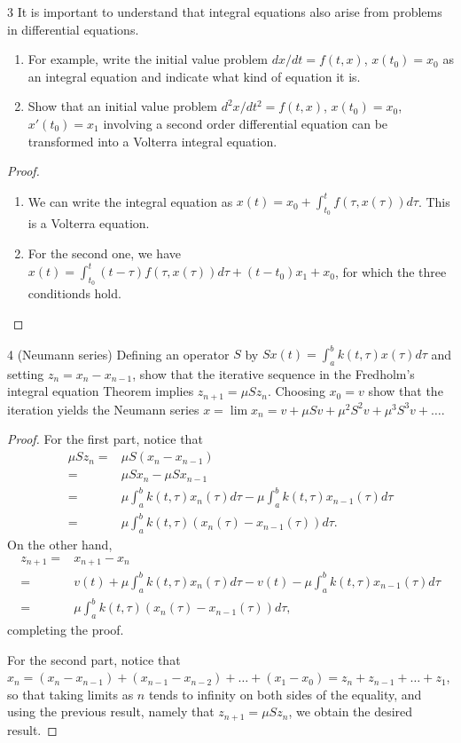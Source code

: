 \begin{exercise}{3}
It is important to understand that integral equations also arise from problems in differential equations.
\begin{enumerate}
    \item For example, write the initial value problem $dx/dt = f(t, x)$, $x(t_0) = x_0$ as an integral equation and indicate what kind of equation it is.
    \item Show that an initial value problem $d^2x / dt^2 = f(t, x)$, $x(t_0) = x_0$, $x'(t_0) = x_1$ involving a second order differential equation can be transformed into a Volterra integral equation.
\end{enumerate}
\end{exercise}
\begin{proof}
\begin{enumerate}
    \item We can write the integral equation as $x(t) = x_0 + \int_{t_0}^t f(\tau, x(\tau)) d\tau$.
    This is a Volterra equation.
    \item For the second one, we have $x(t) = \int_{t_0}^t (t - \tau) f(\tau, x(\tau)) d\tau + (t - t_0) x_1 + x_0$, for which the three conditionds hold.
\end{enumerate}
\end{proof} 

\begin{exercise}{4 (Neumann series)}
Defining an operator $S$ by $Sx(t) = \int_a^b k(t, \tau) x(\tau) d\tau$ and setting $z_n = x_n - x_{n-1}$, show that the iterative sequence in the Fredholm's integral equation Theorem implies $z_{n+1} = \mu Sz_n$.
Choosing $x_0 = v$ show that the iteration yields the Neumann series $x = \lim x_n = v + \mu Sv + \mu^2 S^2 v + \mu^3 S^3 v + \dots$.
\end{exercise}
\begin{proof}
For the first part, notice that
\begin{align*}
    \mu S z_n 
    =& \mu S(x_n - x_{n-1})\\
    =& \mu Sx_n - \mu Sx_{n-1}\\
    =& \mu \int_a^b k(t, \tau) x_n(\tau) d\tau
        - \mu \int_a^b k(t, \tau) x_{n-1}(\tau) d\tau\\
    =& \mu \int_a^b k(t, \tau) (x_n(\tau) - x_{n-1}(\tau)) d\tau.
\end{align*}
On the other hand,
\begin{align*}
    z_{n+1}
    =& x_{n+1} - x_n\\
    =& v(t) + \mu \int_a^b k(t, \tau) x_n(\tau) d\tau
        - v(t) - \mu \int_a^b k(t, \tau) x_{n-1}(\tau) d\tau\\
    =& \mu \int_a^b k(t, \tau) (x_n(\tau) - x_{n-1}(\tau)) d\tau,
\end{align*}
completing the proof.

For the second part, notice that $x_n = (x_n - x_{n-1}) + (x_{n-1} - x_{n-2}) + \dots + (x_1 - x_0) = z_n + z_{n-1} + \dots + z_1$, so that taking limits as $n$ tends to infinity on both sides of the equality, and using the previous result, namely that $z_{n+1} = \mu S z_n$, we obtain the desired result.
\end{proof} 

